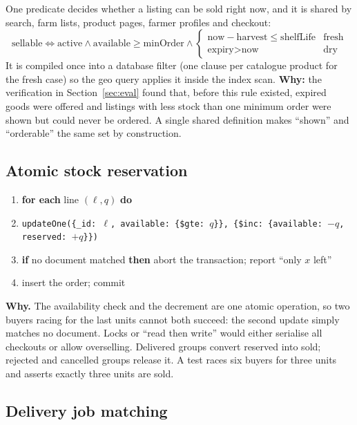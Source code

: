 \documentclass[11pt,a4paper]{article}
\newenvironment{pseudo}{\small\begin{enumerate}[label={\scriptsize\arabic*}, leftmargin=7mm, itemsep=1pt, topsep=3pt]}{\end{enumerate}}
\newcommand{\kw}[1]{\textbf{#1}}
\newcommand{\ind}{\hspace*{5mm}}
\begin{document}
One predicate decides whether a listing can be sold right now, and it is shared by search, farm lists, product pages, farmer profiles and checkout:
\[
\text{sellable} \iff \text{active} \wedge \text{available} \ge \text{minOrder} \wedge
\begin{cases}
\text{now} - \text{harvest} \le \text{shelfLife} & \text{fresh}\\
\text{expiry} > \text{now} & \text{dry}
\end{cases}
\]
It is compiled once into a database filter (one clause per catalogue product for the fresh case) so the geo query applies it inside the index scan. \textbf{Why:} the verification in Section~\ref{sec:eval} found that, before this rule existed, expired goods were offered and listings with less stock than one minimum order were shown but could never be ordered. A single shared definition makes ``shown'' and ``orderable'' the same set by construction.

\subsection{Atomic stock reservation}

\begin{algorithm}[H]
\caption{Reserve stock for an order (inside one transaction)}
\begin{pseudo}
  \item \kw{for each} line $(\ell, q)$ \kw{do}
  \item \ind \texttt{updateOne(\{\_id: $\ell$, available: \{\$gte: $q$\}\}, \{\$inc: \{available: $-q$, reserved: $+q$\}\})}
  \item \ind \kw{if} no document matched \kw{then} abort the transaction; report ``only $x$ left''
  \item insert the order; commit
\end{pseudo}
\end{algorithm}

\noindent \textbf{Why.} The availability check and the decrement are one atomic operation, so two buyers racing for the last units cannot both succeed: the second update simply matches no document. Locks or ``read then write'' would either serialise all checkouts or allow overselling. Delivered groups convert reserved into sold; rejected and cancelled groups release it. A test races six buyers for three units and asserts exactly three units are sold.

\subsection{Delivery job matching}
\end{document}
